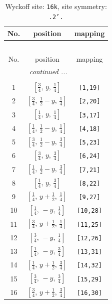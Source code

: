 \documentclass[fleqn,8pt]{jsarticle}
\begin{document}
\renewcommand{\arraystretch}{1.2}
\begin{longtable}{ccc}
\caption{Wyckoff site: {\tt 16k}, site symmetry: {\tt .2'.}}
 \\
 \hline \hline
No. & position & mapping \\ \hline \endfirsthead

\multicolumn{2}{l}{\tablename\ \thetable{}} \\
 \hline \hline
No. & position & mapping \\ \hline \endhead

 \hline \hline
\multicolumn{2}{r}{\footnotesize\it continued ...} \\ \endfoot

 \hline \hline
\multicolumn{2}{r}{} \\ \endlastfoot

1 & $\left[ \frac{3}{4},\, y,\, \frac{1}{4} \right]$ & {\tt [1,19]} \\ \hline
2 & $\left[ \frac{3}{4},\, \frac{1}{2} - y,\, \frac{1}{4} \right]$ & {\tt [2,20]} \\ \hline
3 & $\left[ \frac{1}{4},\, y,\, \frac{1}{4} \right]$ & {\tt [3,17]} \\ \hline
4 & $\left[ \frac{1}{4},\, \frac{1}{2} - y,\, \frac{1}{4} \right]$ & {\tt [4,18]} \\ \hline
5 & $\left[ \frac{3}{4},\, \frac{1}{2} - y,\, \frac{3}{4} \right]$ & {\tt [5,23]} \\ \hline
6 & $\left[ \frac{3}{4},\, y,\, \frac{3}{4} \right]$ & {\tt [6,24]} \\ \hline
7 & $\left[ \frac{1}{4},\, \frac{1}{2} - y,\, \frac{3}{4} \right]$ & {\tt [7,21]} \\ \hline
8 & $\left[ \frac{1}{4},\, y,\, \frac{3}{4} \right]$ & {\tt [8,22]} \\ \hline
9 & $\left[ \frac{1}{4},\, y + \frac{1}{2},\, \frac{1}{4} \right]$ & {\tt [9,27]} \\ \hline
10 & $\left[ \frac{1}{4},\, - y,\, \frac{1}{4} \right]$ & {\tt [10,28]} \\ \hline
11 & $\left[ \frac{3}{4},\, y + \frac{1}{2},\, \frac{1}{4} \right]$ & {\tt [11,25]} \\ \hline
12 & $\left[ \frac{3}{4},\, - y,\, \frac{1}{4} \right]$ & {\tt [12,26]} \\ \hline
13 & $\left[ \frac{1}{4},\, - y,\, \frac{3}{4} \right]$ & {\tt [13,31]} \\ \hline
14 & $\left[ \frac{1}{4},\, y + \frac{1}{2},\, \frac{3}{4} \right]$ & {\tt [14,32]} \\ \hline
15 & $\left[ \frac{3}{4},\, - y,\, \frac{3}{4} \right]$ & {\tt [15,29]} \\ \hline
16 & $\left[ \frac{3}{4},\, y + \frac{1}{2},\, \frac{3}{4} \right]$ & {\tt [16,30]} \\
\end{longtable}
\end{document}
